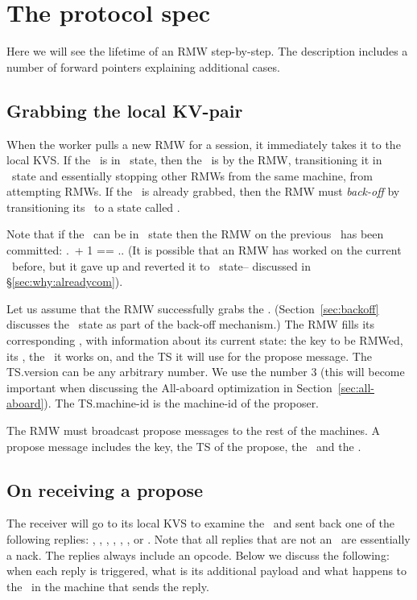\section{The protocol spec}\label{sec:prot}
Here we will see the lifetime of an RMW step-by-step. The description includes a number of forward pointers explaining additional cases.


\subsection{Grabbing the local KV-pair}
When the worker pulls a new RMW for a session, it immediately takes it to the local KVS. If the \kv~is in \invalid~state, then the \kv~is  by the RMW, transitioning it in \proped~state and essentially stopping other RMWs from the same machine, from attempting RMWs. 
If the \kv~is already grabbed, then the RMW must \emph{back-off} by transitioning its \locentry~to a state called \need.

Note that if the \kv~can be in \invalid~state then the RMW on the previous \logno~has been committed:
\kv.\comlogno~+ 1 == \kv.\logno. (It is possible that an RMW has worked on the current \logno~before, but it gave up and reverted it to \invalid~state-- discussed in \S\ref{sec:why:alreadycom}).


Let us assume that the RMW successfully grabs the \kv. (Section~\ref{sec:backoff} discusses the \need~state as part of the back-off mechanism.)
The RMW fills its corresponding \locentry, with information about its current state: the key to be RMWed, its \rmw, the \logno~it works on, and the TS it will use for the propose message. The TS.version can be any arbitrary number. We use the number 3 (this will become important when discussing the All-aboard optimization in Section~\ref{sec:all-aboard}). The TS.machine-id is the machine-id of the proposer.



\custvspace
{}
The RMW must broadcast propose messages to the rest of the machines. A propose message includes the key, the TS of the propose, the \logno~and the \rmw. 

\subsection{On receiving a propose}
The receiver will go to its local KVS to examine the \kv~and sent back one of the following replies: \alreadycom, \loglow, \loghigh, \highprop, \highacc, \lowacc, or \ack.
Note that all replies that are not an \ack~are essentially a nack.
The replies always include an opcode.
Below we discuss the following: when each reply is triggered, what is its additional payload and what happens to the \kv~in the machine that sends the reply. 

